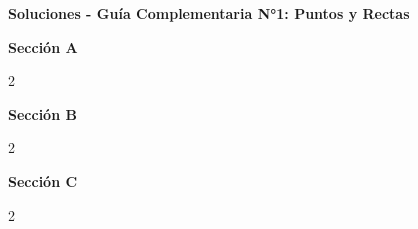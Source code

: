 \documentclass[12pt,a4paper]{article}
\begin{document}
\newpage
\small
\begin{center}
    {\bfseries\Large Soluciones - Guía Complementaria N°1: Puntos y Rectas}\\[10pt]
\end{center}

\textbf{Sección A}
\begin{multicols}{2}

\end{multicols}

\vspace{0.4cm}
\textbf{Sección B}
\begin{multicols}{2}

\end{multicols}

\vspace{0.4cm}
\textbf{Sección C}
\begin{multicols}{2}

\end{multicols}
\end{document}
